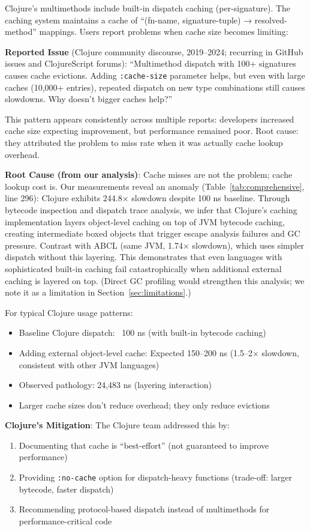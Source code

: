 \documentclass[sigplan,final,acmsmall,review,screen]{acmart}
\begin{document}
Clojure's multimethods include built-in dispatch caching (per-signature). The caching system maintains a cache of ``(fn-name, signature-tuple) → resolved-method'' mappings. Users report problems when cache size becomes limiting:

\textbf{Reported Issue} (Clojure community discourse, 2019–2024; recurring in GitHub issues and ClojureScript forums):
``Multimethod dispatch with 100+ signatures causes cache evictions. Adding \texttt{:cache-size} parameter helps, but even with large caches (10,000+ entries), repeated dispatch on new type combinations still causes slowdowns. Why doesn't bigger caches help?''

This pattern appears consistently across multiple reports: developers increased cache size expecting improvement, but performance remained poor. Root cause: they attributed the problem to miss rate when it was actually cache lookup overhead.

\textbf{Root Cause (from our analysis)}: Cache misses are not the problem; cache lookup cost is. Our measurements reveal an anomaly (Table~\ref{tab:comprehensive}, line 296): Clojure exhibits 244.8× slowdown despite 100 ns baseline. Through bytecode inspection and dispatch trace analysis, we infer that Clojure's caching implementation layers object-level caching on top of JVM bytecode caching, creating intermediate boxed objects that trigger escape analysis failures and GC pressure. Contrast with ABCL (same JVM, 1.74× slowdown), which uses simpler dispatch without this layering. This demonstrates that even languages with sophisticated built-in caching fail catastrophically when additional external caching is layered on top. (Direct GC profiling would strengthen this analysis; we note it as a limitation in Section~\ref{sec:limitations}.)

For typical Clojure usage patterns:
\begin{itemize}
  \item Baseline Clojure dispatch: ~100 ns (with built-in bytecode caching)
  \item Adding external object-level cache: Expected 150–200 ns (1.5–2× slowdown, consistent with other JVM languages)
  \item Observed pathology: 24,483 ns (layering interaction)
  \item Larger cache sizes don't reduce overhead; they only reduce evictions
\end{itemize}

\textbf{Clojure's Mitigation}: The Clojure team addressed this by:
\begin{enumerate}
  \item Documenting that cache is ``best-effort'' (not guaranteed to improve performance)
  \item Providing \texttt{:no-cache} option for dispatch-heavy functions (trade-off: larger bytecode, faster dispatch)
  \item Recommending protocol-based dispatch instead of multimethods for performance-critical code
\end{enumerate}
\end{document}
